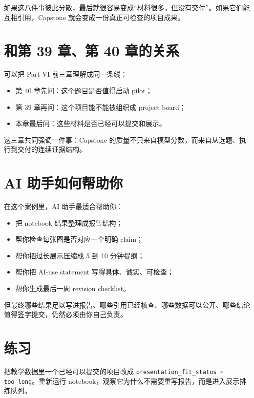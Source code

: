如果这八件事彼此分散，最后就很容易变成“材料很多，但没有交付”。如果它们能互相引用，Capstone 就会变成一份真正可检查的项目成果。

\section{和第 39 章、第 40 章的关系}

可以把 Part VI 前三章理解成同一条线：

\begin{itemize}
    \item 第 40 章先问：这个题目是否值得启动 pilot；
    \item 第 39 章再问：这个项目能不能被组织成 project board；
    \item 本章最后问：这些材料是否已经可以提交和展示。
\end{itemize}

这三章共同强调一件事：Capstone 的质量不只来自模型分数，而来自从选题、执行到交付的连续证据结构。

\section{AI 助手如何帮助你}

在这个案例里，AI 助手最适合帮助你：

\begin{itemize}
    \item 把 notebook 结果整理成报告结构；
    \item 帮你检查每张图是否对应一个明确 claim；
    \item 帮你把过长展示压缩成 5 到 10 分钟提纲；
    \item 帮你把 AI-use statement 写得具体、诚实、可检查；
    \item 帮你生成最后一周 revision checklist。
\end{itemize}

但最终哪些结果足以写进报告、哪些引用已经核查、哪些数据可以公开、哪些结论值得签字提交，仍然必须由你自己负责。

\section{练习}

\begin{exercisebox}[基础练习]
把教学数据里一个已经可以提交的项目改成 \texttt{presentation\_fit\_status = too\_long}。重新运行 notebook，观察它为什么不需要重写报告，而是进入展示排练队列。
\end{exercisebox}

